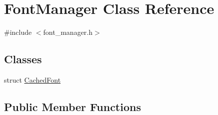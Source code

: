 \hypertarget{class_font_manager}{\section{Font\+Manager Class Reference}
\label{class_font_manager}
}


{\ttfamily \#include $<$font\+\_\+manager.\+h$>$}

\subsection*{Classes}
\begin{DoxyCompactItemize}
\item 
struct \hyperlink{struct_font_manager_1_1_cached_font}{Cached\+Font}
\end{DoxyCompactItemize}
\subsection*{Public Member Functions}
